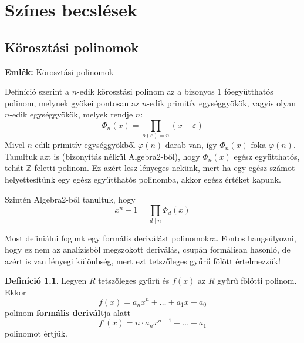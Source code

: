 \documentclass[12pt]{book}
\theoremstyle{plain} %
\theoremstyle{definition} %
\newtheorem{defi/}{Definíció}[section]
\newenvironment{defi}
  {\renewcommand{\qedsymbol}{$\clubsuit$}%
   \pushQED{\qed}\begin{defi/}}
  {\popQED\end{defi/}}
\theoremstyle{remark}
\renewcommand\qedsymbol{$\blacksquare$}
\numberwithin{equation}{section}  %
\def\Z{\mathbb{Z}}
\begin{document}
	

	\chapter{Színes becslések}
	
	
	\section{Körosztási polinomok}
	
	\textbf{Emlék:} Körosztási polinomok
	
	Definíció szerint a $n$-edik körosztási polinom az a bizonyos $1$ főegyütthatós polinom, melynek gyökei pontosan az $n$-edik primitív egységgyökök, vagyis olyan $n$-edik egységgyökök, melyek rendje $n$:
	\[ \Phi_n(x) = \prod_{o(\varepsilon) = n} (x-\varepsilon)  \]
	Mivel $n$-edik primitív egységgyökből $\varphi(n)$ darab van, így $\Phi_n(x)$ foka $\varphi(n)$. Tanultuk azt is (bizonyítás nélkül Algebra2-ből), hogy $\Phi_n(x)$ egész együtthatós, tehát $\Z$ feletti polinom. Ez azért lesz lényeges nekünk, mert ha egy egész számot helyettesítünk egy egész együtthatós polinomba, akkor egész értéket kapunk.
	
	Szintén Algebra2-ből tanultuk, hogy
	\[  x^n - 1 = \prod_{d\mid n} \Phi_d(x)  \]
	\hrulefill
	
	Most definiálni fogunk egy formális deriválást polinomokra. Fontos hangsúlyozni, hogy ez nem az analízisből megszokott deriválás, csupán formálisan hasonló, de azért is van lényegi különbség, mert ezt tetszőleges gyűrű fölött értelmezzük!
	
	\begin{defi}
		Legyen $R$ tetszőleges gyűrű és $f(x)$ az $R$ gyűrű fölötti polinom. Ekkor
		\[ f(x) = a_n x^n + \ldots + a_1 x + a_0  \]
		polinom \textbf{formális derivált}ja alatt
		\[ f'(x) = n\cdot a_n x^{n-1} + \ldots + a_1  \]
		polinomot értjük.
	\end{defi}
\end{document}
